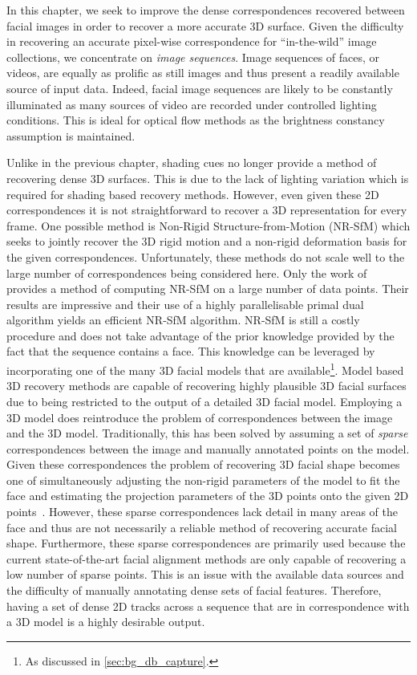 In this chapter, we seek to improve the dense
correspondences recovered between facial images in order to recover a more
accurate 3D surface. Given the difficulty in recovering an accurate pixel-wise
correspondence for ``in-the-wild'' image collections, we concentrate on
\textit{image sequences}. Image sequences of faces, or videos, are equally
as prolific as still images and thus present a readily available source of
input data. Indeed, facial image sequences are likely to be constantly
illuminated as many sources of video are recorded under controlled lighting
conditions. This is ideal for optical flow methods as the brightness constancy
assumption is maintained. 

Unlike in the previous chapter, shading cues
no longer provide a method of recovering dense 3D surfaces. This is due
to the lack of lighting variation which is required for shading based
recovery methods. However, even given these 2D correspondences it is not
straightforward to recover a 3D representation for every frame. One possible
method is Non-Rigid Structure-from-Motion (NR-SfM) which seeks to jointly
recover the 3D rigid motion and a non-rigid deformation basis for the given
correspondences. Unfortunately, these methods do not scale well to the large number
of correspondences being considered here. Only the work of \citet{garg2013dense}
provides a method of computing NR-SfM on a large number of data points. Their 
results are impressive and their use of a highly parallelisable primal
dual algorithm yields an efficient NR-SfM algorithm. NR-SfM is still
a costly procedure and does not take advantage of the prior knowledge provided
by the fact that the sequence contains a face. This knowledge can be leveraged
by incorporating one of the many 3D facial models that are available\footnote{As
discussed in \cref{sec:bg_db_capture}.}. Model based 3D recovery methods
are capable of recovering highly plausible 3D facial surfaces due to being
restricted to the output of a detailed 3D facial model. Employing a 3D model
does reintroduce the problem of correspondences between the image and the 3D model.
Traditionally, this has been solved by assuming a set of \textit{sparse}
correspondences between the image and manually annotated points on the model.
Given these correspondences the problem of recovering 3D facial shape becomes
one of simultaneously adjusting the non-rigid parameters of the model to fit
the face and estimating the projection parameters of the 3D points onto the given
2D points~\cite{aldrian2010linear,aldrian2013inverse,bas2016fitting}.
However, these sparse correspondences lack
detail in many areas of the face and thus are not necessarily a reliable method
of recovering accurate facial shape. Furthermore, these sparse correspondences
are primarily used because the current state-of-the-art facial 
alignment methods are only capable of recovering a low number of sparse points.
This is an issue with the available data sources and the difficulty of manually
annotating dense sets of facial features. Therefore, having a set of dense
2D tracks across a sequence that are in correspondence with a 3D model is a
highly desirable output.

